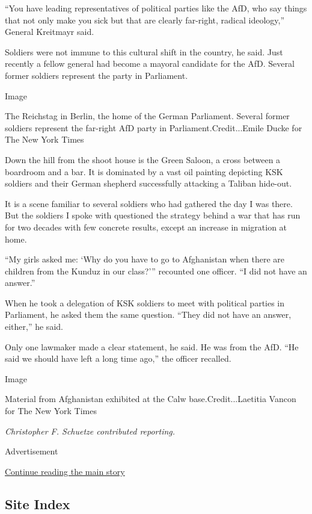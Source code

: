 ``You have leading representatives of political parties like the AfD,
who say things that not only make you sick but that are clearly
far-right, radical ideology,'' General Kreitmayr said.

Soldiers were not immune to this cultural shift in the country, he said.
Just recently a fellow general had become a mayoral candidate for the
AfD. Several former soldiers represent the party in Parliament.

Image

The Reichstag in Berlin, the home of the German Parliament. Several
former soldiers represent the far-right AfD party in
Parliament.Credit...Emile Ducke for The New York Times

Down the hill from the shoot house is the Green Saloon, a cross between
a boardroom and a bar. It is dominated by a vast oil painting depicting
KSK soldiers and their German shepherd successfully attacking a Taliban
hide-out.

It is a scene familiar to several soldiers who had gathered the day I
was there. But the soldiers I spoke with questioned the strategy behind
a war that has run for two decades with few concrete results, except an
increase in migration at home.

``My girls asked me: `Why do you have to go to Afghanistan when there
are children from the Kunduz in our class?''' recounted one officer. ``I
did not have an answer.''

When he took a delegation of KSK soldiers to meet with political parties
in Parliament, he asked them the same question. ``They did not have an
answer, either,'' he said.

Only one lawmaker made a clear statement, he said. He was from the AfD.
``He said we should have left a long time ago,'' the officer recalled.

Image

Material from Afghanistan exhibited at the Calw base.Credit...Laetitia
Vancon for The New York Times

\emph{Christopher F. Schuetze contributed reporting.}

Advertisement

\protect\hyperlink{after-bottom}{Continue reading the main story}

\hypertarget{site-index}{%
\subsection{Site Index}\label{site-index}}

